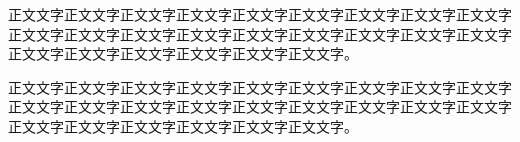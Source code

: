 

\begin{publication}
正文文字正文文字正文文字正文文字正文文字正文文字正文文字正文文字正文文字正文文字正文文字正文文字正文文字正文文字正文文字正文文字正文文字正文文字正文文字正文文字正文文字正文文字正文文字正文文字。

正文文字正文文字正文文字正文文字正文文字正文文字正文文字正文文字正文文字正文文字正文文字正文文字正文文字正文文字正文文字正文文字正文文字正文文字正文文字正文文字正文文字正文文字正文文字正文文字。
\end{publication}
